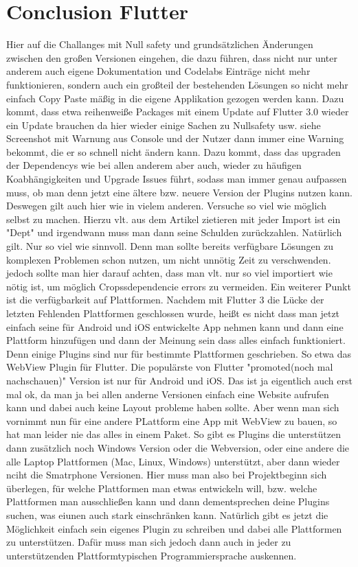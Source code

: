 \section{Conclusion Flutter}
Hier auf die Challanges mit Null safety und grundsätzlichen Änderungen zwischen den großen Versionen eingehen, die dazu führen, dass nicht nur unter anderem auch eigene Dokumentation und Codelabs Einträge nicht mehr funktionieren, sondern auch ein großteil der bestehenden Lösungen so nicht mehr einfach Copy Paste mäßig in die eigene Applikation gezogen werden kann.
Dazu kommt, dass etwa reihenweiße Packages mit einem Update auf Flutter 3.0 wieder ein Update brauchen da hier wieder einige Sachen zu Nullsafety usw. siehe Screenshot mit Warnung aus Console und der Nutzer dann immer eine Warning bekommt, die er so schnell nicht ändern kann. Dazu kommt, dass das upgraden der Dependencys wie bei allen anderem aber auch, wieder zu häufigen Koabhängigkeiten und Upgrade Issues führt, sodass man immer genau aufpassen muss, ob man denn jetzt eine ältere bzw. neuere Version der Plugins nutzen kann. Deswegen gilt auch hier wie in vielem anderen. Versuche so viel wie möglich selbst zu machen. Hierzu vlt. aus dem Artikel zietieren mit jeder Import ist ein "Dept" und irgendwann muss man dann seine Schulden zurückzahlen. Natürlich gilt. Nur so viel wie sinnvoll. Denn man sollte bereits verfügbare Lösungen zu komplexen Problemen schon nutzen, um nicht unnötig Zeit zu verschwenden. jedoch sollte man hier darauf achten, dass man vlt. nur so viel importiert wie nötig ist, um möglich Cropssdependencie errors zu vermeiden.
Ein weiterer Punkt ist die verfügbarkeit auf Plattformen. Nachdem mit Flutter 3 die Lücke der letzten Fehlenden Plattformen geschlossen wurde, heißt es nicht dass man jetzt einfach seine für Android und iOS entwickelte App nehmen kann und dann eine Plattform hinzufügen und dann der Meinung sein dass alles einfach funktioniert. Denn einige Plugins sind nur für bestimmte Plattformen geschrieben. So etwa das WebView Plugin für Flutter. Die populärste von Flutter "promoted(noch mal nachschauen)" Version ist nur für Android und iOS. Das ist ja eigentlich auch erst mal ok, da man ja bei allen anderne Versionen einfach eine Website aufrufen kann und dabei auch keine Layout probleme haben sollte. Aber wenn man sich vornimmt nun für eine andere PLattform eine App mit WebView zu bauen, so hat man leider nie das alles in einem Paket. So gibt es Plugins die unterstützen dann zusätzlich noch Windows Version oder die Webversion, oder eine andere die alle Laptop Plattformen (Mac, Linux, Windows) unterstützt, aber dann wieder nciht die Smatrphone Versionen. Hier muss man also bei Projektbeginn sich überlegen, für welche Plattformen man etwas entwickeln will, bzw. welche Plattformen man ausschließen kann und dann dementsprechen deine Plugins suchen, was eiunen auch stark einschränken kann. Natürlich gibt es jetzt die Möglichkeit einfach sein eigenes Plugin zu schreiben und dabei alle Plattformen zu unterstützen. Dafür muss man sich jedoch dann auch in jeder zu unterstützenden Plattformtypischen Programmiersprache auskennen.